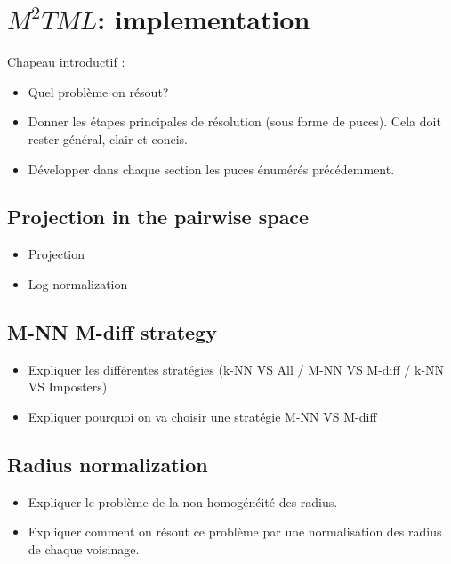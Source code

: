 \chapter{$M^2TML$: implementation}
\label{sec:unchapitre}
\minitoc

\noindent Chapeau introductif :
\begin{itemize}
	\item Quel problème on résout?
	\item Donner les étapes principales de résolution (sous forme de puces). Cela doit rester général, clair et concis.
	\item Développer dans chaque section les puces énumérés précédemment.
\end{itemize}

\section{Projection in the pairwise space}
\begin{itemize}
	\item Projection
	\item Log normalization
\end{itemize}


\section{M-NN M-diff strategy}
\begin{itemize}
	\item Expliquer les différentes stratégies (k-NN VS All / M-NN VS M-diff / k-NN VS Imposters)
	\item Expliquer pourquoi on va choisir une stratégie M-NN VS M-diff
\end{itemize}


\section{Radius normalization}
\begin{itemize}
	\item Expliquer le problème de la non-homogénéité des radius.
	\item Expliquer comment on résout ce problème par une normalisation des radius de chaque voisinage.
\end{itemize}


